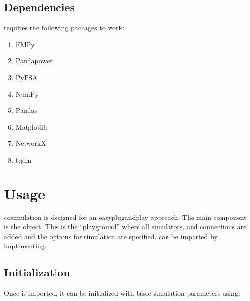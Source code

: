 \documentclass[letterpaper,10pt,english]{sphinxmanual}
\begin{document}
\begin{sphinxVerbatim}[commandchars=\\\{\}]
  
\end{sphinxVerbatim}


\section{Dependencies}
\label{\detokenize{index:dependencies}}
 requires the following packages to work:
\begin{enumerate}
%
\item {} 
FMPy

\item {} 
Pandapower

\item {} 
PyPSA

\item {} 
NumPy

\item {} 
Pandas

\item {} 
Matplotlib

\item {} 
NetworkX

\item {} 
tqdm

\end{enumerate}


\chapter{Usage}
\label{\detokenize{index:usage}}
 cosimulation is designed for an easy\sphinxhyphen{}plug\sphinxhyphen{}and\sphinxhyphen{}play approach. The main component is the  object. This is the “playground” where all simulators, and connections are added and the options for simulation are specified.  can be imported by implementing:

\begin{sphinxVerbatim}[commandchars=\\\{\}]
   
\end{sphinxVerbatim}


\section{Initialization}
\label{\detokenize{index:initialization}}
Once  is imported, it can be initialized with basic simulation parameters using:
\end{document}
